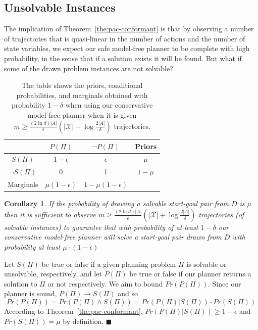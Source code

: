 \documentclass{article}
\newtheorem{corollary}{Corollary}
\newenvironment{proof}{\noindent{\bf Proof:~~}}{\qed}
\newcommand{\qed}{\hfill\ensuremath{\blacksquare}}
\newcommand{\solvable}{\textit{S}}
\newcommand{\plannable}{\textit{P}}
\begin{document}
	\subsection{Unsolvable Instances}
	
	The implication of Theorem~\ref{the:pac-conformant} is that by observing 
	a number of trajectories that is quasi-linear in the number of actions and the number of state variables, 
	we expect our safe model-free planner to be complete with high probability, in the sense that if a solution exists it will be found. But what if some of the drawn problem instances are not solvable? 

\begin{table}
	\centering
	\begin{tabular}{c|c|c|c}
			& $\plannable (\Pi)$ & $\neg\plannable(\Pi)$ & Priors \\ \hline
		$\solvable(\Pi)$ 		& $1-\epsilon$ & $\epsilon$ & $\mu$ \\
		$\neg\solvable(\Pi)$	& 0 & 1 & $1-\mu$ \\ \hline
		Marginals	& $\mu (1-\epsilon)$ & $1-\mu(1-\epsilon)$ &
	\end{tabular}
\caption{The table shows the priors, conditional probabilities, and marginals obtained with probability $1-\delta$ when using our conservative model-free planner when it is given $m\geq\frac{(2\ln  d)|A|}{\epsilon}(|\mathcal{X}|+\log\frac{2|A|}{\delta})$ trajectories.}
\label{tab:probabilities}	
\end{table}

	\begin{corollary}
		If the probability of drawing a solvable start-goal pair from $D$ is $\mu$ then it is sufficient to 
		observe $m\geq\frac{(2\ln  d)|A|}{\epsilon}(|\mathcal{X}|+\log\frac{2|A|}{\delta})$
		trajectories (of solvable instances) to guarantee that with probability of at least $1-\delta$ our conservative model-free planner will solve a start-goal pair drawn from $D$ with probability at least $\mu\cdot(1-\epsilon)$ 
\label{cor:unsolvable}
	\end{corollary}
\begin{proof}
	Let $\solvable(\Pi)$ be true or false if  a given planning problem $\Pi$ is solvable or unsolvable, respectively, 
	and let $\plannable(\Pi)$ be true or false if our planner returns a solution to $\Pi$ or not respectively. We aim to bound $Pr(\plannable(\Pi))$. Since our planner is sound, $\plannable(\Pi)\rightarrow \solvable(\Pi)$ and so
	\[ Pr(\plannable(\Pi))= Pr(\plannable(\Pi)\wedge \solvable(\Pi))= Pr(\plannable(\Pi)|\solvable(\Pi))\cdot Pr(\solvable(\Pi)) \]
	According to Theorem~\ref{the:pac-conformant}, 
	$Pr(\plannable(\Pi)|\solvable(\Pi))\geq 1-\epsilon$ 
	and $Pr(\solvable(\Pi))=\mu$ by definition. 
\end{proof}
\end{document}
